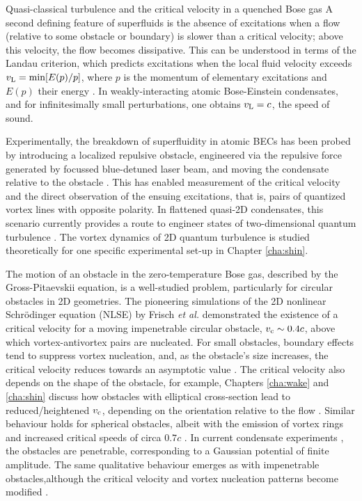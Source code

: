 \begin{chapter}{\label{cha:nonequib}Quasi-classical turbulence and the critical velocity in a quenched Bose gas}
A second defining feature of superfluids is the absence of excitations when a flow (relative to some obstacle or boundary) is slower than a critical velocity; above this velocity, the flow becomes dissipative.  This can be understood in terms of the Landau criterion, which predicts excitations when the local fluid velocity exceeds $v_{\rm L} = \textrm{min} [E(p)/p]$, where $p$ is the momentum of elementary excitations and $E(p)$ their energy \cite{NozieresPines}. In weakly-interacting atomic Bose-Einstein condensates, and for infinitesimally small perturbations, one obtains $v_{\rm L} = c$, the speed of sound.

Experimentally, the breakdown of superfluidity in atomic BECs has been probed by introducing a localized repulsive obstacle, engineered via the repulsive force generated by focussed blue-detuned laser beam, and moving the condensate relative to the obstacle \cite{Neely,kwon_moon_14,kwon_2015a,kwon_2015b,Raman,Onofrio,Inouye,desbuquois_2012}. This has enabled measurement of the critical velocity and the direct observation of the ensuing excitations, that is, pairs of quantized vortex lines with opposite polarity.
In flattened quasi-2D condensates, this scenario currently provides a route to engineer states of two-dimensional quantum turbulence \cite{Neely,kwon_moon_14}. The vortex dynamics of 2D quantum turbulence is studied theoretically for one specific experimental set-up \cite{kwon_moon_14} in Chapter \ref{cha:shin}.

The motion of an obstacle in the zero-temperature Bose gas, described by the Gross-Pitaevskii equation, is a well-studied problem, particularly for circular obstacles in 2D geometries.  The pioneering simulations of the 2D nonlinear Schr\"odinger equation (NLSE) by Frisch {\it et al.} \cite{frisch92} demonstrated the existence of a critical velocity for a moving impenetrable circular obstacle, $v_{\rm c}\sim 0.4c$, above which vortex-antivortex pairs are nucleated.
For small obstacles, boundary effects tend to suppress vortex nucleation,
and, as the obstacle's size increases, the critical velocity reduces towards an asymptotic value \cite{berloff2000,rica2001,pham2004}.  The critical velocity also depends on the shape of the obstacle, for example, Chapters \ref{cha:wake} and \ref{cha:shin} discuss how obstacles with elliptical cross-section lead to reduced/heightened $v_{\rm c}$, depending on the orientation relative to the flow \cite{stagg_parker_14, stagg_2015b}. Similar behaviour holds for spherical obstacles, albeit with the emission of vortex rings and increased critical speeds of circa $0.7 c$ \cite{winiecki_2000,win01,stagg_parker_14}.
In current condensate experiments \cite{Neely,kwon_moon_14,Raman,Onofrio,Inouye,desbuquois_2012, kwon_2015a,kwon_2015b}, the obstacles are penetrable, corresponding to a Gaussian potential of finite amplitude. The same qualitative behaviour emerges as with impenetrable obstacles,although the critical velocity and vortex nucleation patterns become modified \cite{saito10}.


\end{chapter}
